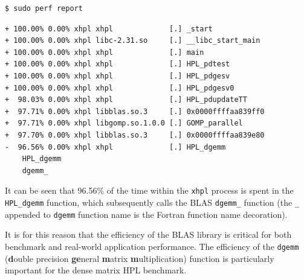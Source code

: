 \documentclass{report}
\begin{document}
\lstset{style=type}
\begin{lstlisting}
$ sudo perf report
\end{lstlisting}

\lstset{style=term}
\begin{lstlisting}
+ 100.00% 0.00% xhpl xhpl             [.] _start                                                                                        
+ 100.00% 0.00% xhpl libc-2.31.so     [.] __libc_start_main                                                                             
+ 100.00% 0.00% xhpl xhpl             [.] main                                                                                          
+ 100.00% 0.00% xhpl xhpl             [.] HPL_pdtest                                                                                    
+ 100.00% 0.00% xhpl xhpl             [.] HPL_pdgesv                                                                                    
+ 100.00% 0.00% xhpl xhpl             [.] HPL_pdgesv0                                                                                   
+  98.03% 0.00% xhpl xhpl             [.] HPL_pdupdateTT                                                                                
+  97.71% 0.00% xhpl libblas.so.3     [.] 0x0000ffffaa839ff0                                                                            
+  97.71% 0.00% xhpl libgomp.so.1.0.0 [.] GOMP_parallel                                                                                 
+  97.70% 0.00% xhpl libblas.so.3     [.] 0x0000ffffaa839e80                                                                            
-  96.56% 0.00% xhpl xhpl             [.] HPL_dgemm                                                                                     
    HPL_dgemm                                                                                                                                           
    dgemm_            
\end{lstlisting}

It can be seen that 96.56\% of the time within the \verb|xhpl| process is spent in the \verb|HPL_dgemm| function, which subsequently calls the BLAS \verb|dgemm_| function (the \verb|_| appended to \verb|dgemm| function name is the Fortran function name decoration).
 
It is for this reason that the efficiency of the BLAS library is critical for both benchmark and real-world application performance. The efficiency of the \verb|dgemm| (\textbf{d}ouble precision \textbf{ge}neral \textbf{m}atrix \textbf{m}ultiplication) function is particularly important for the dense matrix HPL benchmark.
\end{document}
